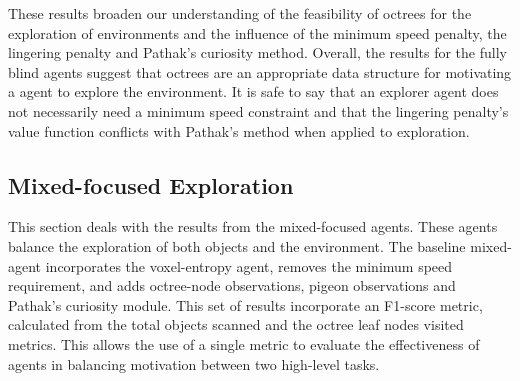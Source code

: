             
            
    
     
     
        These results broaden our understanding of the feasibility of octrees for the exploration of environments and the influence of the minimum speed penalty, the lingering penalty and Pathak's curiosity method. Overall, the results for the fully blind agents suggest that octrees are an appropriate data structure for motivating a agent to explore the environment. 
        It is safe to say that an explorer agent does not necessarily need a minimum speed constraint and that the lingering penalty's value function conflicts with Pathak's method when applied to exploration.
        
    \subsection{Mixed-focused Exploration} \label{chap5:mixed-focused}
        This section deals with the results from the mixed-focused agents. These agents balance the exploration of both objects and the environment. The baseline mixed-agent incorporates the voxel-entropy agent, removes the minimum speed requirement, and adds octree-node observations, pigeon observations and Pathak's curiosity module. 
        This set of results incorporate an F1-score metric, calculated from the total objects scanned and the octree leaf nodes visited metrics. 
        This allows the use of a single metric to evaluate the effectiveness of agents in balancing motivation between two high-level tasks.
       
